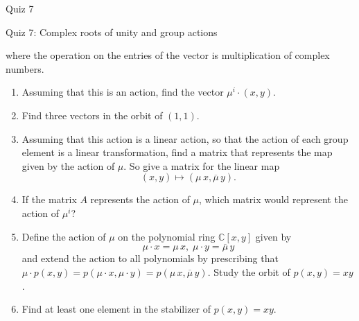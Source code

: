 \documentclass[12pt]{article}
\begin{document}
\begin{quiz}{Quiz 7}
\begin{essay}[response field lines=5,attachments allowed=0]{Quiz 7: Complex roots of unity and group actions}
\begin{enumerate}
where the operation on the entries of the vector is multiplication of complex numbers.
\begin{enumerate}
\item Assuming that this is an action, find the vector $\mu^i \cdotp (x , y)$.
\item Find three vectors in the orbit of $(1,1)$.
\item Assuming that this action is a linear action, so that the action of each group element is a linear transformation, find a matrix that represents the map given by the action of $\mu $. So give a matrix for the linear map 
\[  (x , y) \mapsto  (\mu \,  x , \overline{\mu} \,   y). \]
\item If the matrix $A$ represents the action of $\mu$, which matrix would represent the action of $\mu^i$?
\item Define the action of $\mu $ on the polynomial ring $\mathbb{C}[x,y]$ given by 
\[ \mu  \cdotp x = \mu \,  x , \; \mu  \cdotp y = \overline{\mu} \,   y \]
and extend the action to all polynomials by prescribing that $\mu  \cdotp p(x,y) = p(\mu  \cdotp x, \mu  \cdotp y) = p(\mu\,   x , \overline{\mu} \,   y)$. Study the orbit of $p(x,y)=xy$.
\item Find at least one element in the stabilizer of  $p(x,y)=xy$.
    \end{enumerate} 
    \end{enumerate}
\end{essay}
\end{quiz}
\end{document}
